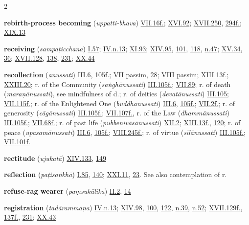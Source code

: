 \begin{multicols}{2}
\begin{vismHanging}
\par\textbf{rebirth-process becoming} (\emph{uppatti-bhava}) \hyperlink{VII.16}{VII.16f.}{}; \hyperlink{XVI.92}{XVI.92}{}; \hyperlink{XVII.250}{XVII.250}{}, \hyperlink{XVII.294}{294f.}{}; \hyperlink{XIX.13}{XIX.13}{}
\par\textbf{receiving} (\emph{sampaṭicchana}) \hyperlink{I.57}{I.57}{}; \hyperlink{IV.n13}{IV.n.13}{}; \hyperlink{XI.93}{XI.93}{}; \hyperlink{XIV.95}{XIV.95}{}, \hyperlink{XIV.101}{101}{}, \hyperlink{XIV.118}{118}{}, \hyperlink{XIV.n47}{n.47}{}; \hyperlink{XV.34}{XV.34}{}, \hyperlink{XV.36}{36}{}; \hyperlink{XVII.128}{XVII.128}{}, \hyperlink{XVII.138}{138}{}, \hyperlink{XVII.231}{231}{}; \hyperlink{XX.44}{XX.44}{}
\par\textbf{recollection} (\emph{anussati}) \hyperlink{III.6}{III.6}{}, \hyperlink{III.105}{105f.}{}; \hyperlink{VII}{VII passim}{}, \hyperlink{VII.28}{28}{}; \hyperlink{VIII}{VIII passim}{}; \hyperlink{XIII.13}{XIII.13f.}{}; \hyperlink{XXIII.20}{XXIII.20}{}; r. of the Community (\emph{saṅghānussati}) \hyperlink{III.105}{III.105f.}{}; \hyperlink{VII.89}{VII.89}{}; r. of death (\emph{maraṇānussati}), see mindfulness of d.; r. of deities (\emph{devatānussati}) \hyperlink{III.105}{III.105}{}; \hyperlink{VII.115}{VII.115f.}{}; r. of the Enlightened One (\emph{buddhānussati}) \hyperlink{III.6}{III.6}{}, \hyperlink{III.105}{105f.}{}; \hyperlink{VII.2}{VII.2f.}{}; r. of generosity (\emph{cāgānussati}) \hyperlink{III.105}{III.105f.}{}; \hyperlink{VII.107}{VII.107f.}{}, r. of the Law (\emph{dhammānussati}) \hyperlink{III.105}{III.105f.}{}; \hyperlink{VII.68}{VII.68f.}{}; r. of past life (\emph{pubbenivāsānussati}) \hyperlink{XII.2}{XII.2}{}; \hyperlink{XIII.13}{XIII.13f.}{}, \hyperlink{XIII.120}{120}{}; r. of peace (\emph{upasamānussati}) \hyperlink{III.6}{III.6}{}, \hyperlink{III.105}{105f.}{}; \hyperlink{VIII.245}{VIII.245f.}{}; r. of virtue (\emph{sīlānussati}) \hyperlink{III.105}{III.105f.}{}; \hyperlink{VII.101}{VII.101f.}{}
\par\textbf{rectitude} (\emph{ujukatā}) \hyperlink{XIV.133}{XIV.133}{}, \hyperlink{XIV.149}{149}{}
\par\textbf{reflection} (\emph{paṭisaṅkhā}) \hyperlink{I.85}{I.85}{}, \hyperlink{I.140}{140}{}; \hyperlink{XXI.11}{XXI.11}{}, \hyperlink{XXI.23}{23}{}. See also contemplation of r. 
\par\textbf{refuse-rag wearer} (\emph{paṃsukūlika}) \hyperlink{II.2}{II.2}{}, \hyperlink{II.14}{14}{}
\par\textbf{registration} (\emph{tadārammaṇa}) \hyperlink{IV.n13}{IV.n.13}{}; \hyperlink{XIV.98}{XIV.98}{}, \hyperlink{XIV.100}{100}{}, \hyperlink{XIV.122}{122}{}, \hyperlink{XIV.n39}{n.39}{}, \hyperlink{XIV.n52}{n.52}{}; \hyperlink{XVII.129}{XVII.129f.}{}, \hyperlink{XVII.137}{137f.}{}, \hyperlink{XVII.231}{231}{}; \hyperlink{XX.43}{XX.43}{}

\end{vismHanging}
\end{multicols}
